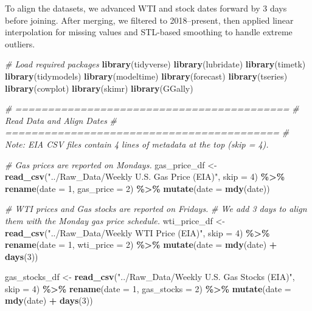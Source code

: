 \documentclass[
]{article}
\newenvironment{Shaded}{\begin{snugshade}}{\end{snugshade}}
\newcommand{\AttributeTok}[1]{\textcolor[rgb]{0.13,0.29,0.53}{#1}}
\newcommand{\CommentTok}[1]{\textcolor[rgb]{0.56,0.35,0.01}{\textit{#1}}}
\newcommand{\DecValTok}[1]{\textcolor[rgb]{0.00,0.00,0.81}{#1}}
\newcommand{\FunctionTok}[1]{\textcolor[rgb]{0.13,0.29,0.53}{\textbf{#1}}}
\newcommand{\NormalTok}[1]{#1}
\newcommand{\OtherTok}[1]{\textcolor[rgb]{0.56,0.35,0.01}{#1}}
\newcommand{\SpecialCharTok}[1]{\textcolor[rgb]{0.81,0.36,0.00}{\textbf{#1}}}
\newcommand{\StringTok}[1]{\textcolor[rgb]{0.31,0.60,0.02}{#1}}
\begin{document}
To align the datasets, we advanced WTI and stock dates forward by 3 days
before joining. After merging, we filtered to 2018--present, then
applied linear interpolation for missing values and STL-based smoothing
to handle extreme outliers.

\begin{Shaded}
\begin{Highlighting}[]
\CommentTok{\# Load required packages}
\FunctionTok{library}\NormalTok{(tidyverse)}
\FunctionTok{library}\NormalTok{(lubridate)}
\FunctionTok{library}\NormalTok{(timetk)}
\FunctionTok{library}\NormalTok{(tidymodels)}
\FunctionTok{library}\NormalTok{(modeltime)}
\FunctionTok{library}\NormalTok{(forecast)}
\FunctionTok{library}\NormalTok{(tseries)}
\FunctionTok{library}\NormalTok{(cowplot)}
\FunctionTok{library}\NormalTok{(skimr)}
\FunctionTok{library}\NormalTok{(GGally)}

\CommentTok{\# ==========================================}
\CommentTok{\# Read Data and Align Dates}
\CommentTok{\# ==========================================}
\CommentTok{\# Note: EIA CSV files contain 4 lines of metadata at the top (skip = 4).}

\CommentTok{\# Gas prices are reported on Mondays.}
\NormalTok{gas\_price\_df }\OtherTok{\textless{}{-}} \FunctionTok{read\_csv}\NormalTok{(}\StringTok{"../Raw\_Data/Weekly U.S. Gas Price (EIA)"}\NormalTok{, }\AttributeTok{skip =} \DecValTok{4}\NormalTok{) }\SpecialCharTok{\%\textgreater{}\%}
  \FunctionTok{rename}\NormalTok{(}\AttributeTok{date =} \DecValTok{1}\NormalTok{, }\AttributeTok{gas\_price =} \DecValTok{2}\NormalTok{) }\SpecialCharTok{\%\textgreater{}\%}
  \FunctionTok{mutate}\NormalTok{(}\AttributeTok{date =} \FunctionTok{mdy}\NormalTok{(date))}

\CommentTok{\# WTI prices and Gas stocks are reported on Fridays.}
\CommentTok{\# We add 3 days to align them with the Monday gas price schedule.}
\NormalTok{wti\_price\_df }\OtherTok{\textless{}{-}} \FunctionTok{read\_csv}\NormalTok{(}\StringTok{"../Raw\_Data/Weekly WTI Price (EIA)"}\NormalTok{, }\AttributeTok{skip =} \DecValTok{4}\NormalTok{) }\SpecialCharTok{\%\textgreater{}\%}
  \FunctionTok{rename}\NormalTok{(}\AttributeTok{date =} \DecValTok{1}\NormalTok{, }\AttributeTok{wti\_price =} \DecValTok{2}\NormalTok{) }\SpecialCharTok{\%\textgreater{}\%}
  \FunctionTok{mutate}\NormalTok{(}\AttributeTok{date =} \FunctionTok{mdy}\NormalTok{(date) }\SpecialCharTok{+} \FunctionTok{days}\NormalTok{(}\DecValTok{3}\NormalTok{))}

\NormalTok{gas\_stocks\_df }\OtherTok{\textless{}{-}} \FunctionTok{read\_csv}\NormalTok{(}\StringTok{"../Raw\_Data/Weekly U.S. Gas Stocks (EIA)"}\NormalTok{, }\AttributeTok{skip =} \DecValTok{4}\NormalTok{) }\SpecialCharTok{\%\textgreater{}\%}
  \FunctionTok{rename}\NormalTok{(}\AttributeTok{date =} \DecValTok{1}\NormalTok{, }\AttributeTok{gas\_stocks =} \DecValTok{2}\NormalTok{) }\SpecialCharTok{\%\textgreater{}\%}
  \FunctionTok{mutate}\NormalTok{(}\AttributeTok{date =} \FunctionTok{mdy}\NormalTok{(date) }\SpecialCharTok{+} \FunctionTok{days}\NormalTok{(}\DecValTok{3}\NormalTok{))}


\end{Highlighting}
\end{Shaded}
\end{document}
